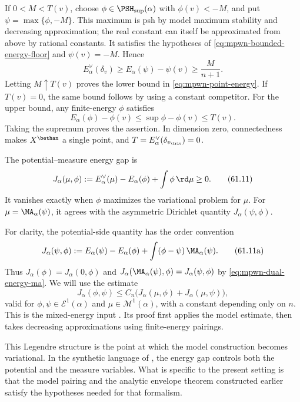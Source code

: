 \begin{example}
If $0<M<T(v)$, choose $\phi\in\PSH_{\sup}(\alpha)$ with
$\phi(v)<-M$, and put $\psi=\max\{\phi,-M\}$.
This maximum is psh by model maximum stability and decreasing
approximation; the real constant can itself be approximated
from above by rational constants.
It satisfies the hypotheses of \eqref{eq:mpwn-bounded-energy-floor}
and $\psi(v)=-M$.  Hence
\[
 E_\alpha^\vee(\delta_v)
       \geq E_\alpha(\psi)-\psi(v)
       \geq\frac{M}{n+1}.
\]
Letting $M\uparrow T(v)$ proves the lower bound in
\eqref{eq:mpwn-point-energy}.  If $T(v)=0$, the same bound follows
by using a constant competitor.
For the upper bound, any finite-energy $\phi$ satisfies
\[
 E_\alpha(\phi)-\phi(v)
                \leq\sup\phi-\phi(v)\leq T(v).
\]
Taking the supremum proves the assertion.  In dimension zero,
connectedness makes $X^{\bethan}$ a single point, and
$T=E_\alpha^\vee(\delta_{v_{\triv}})=0$.
\end{example}

The potential--measure energy gap is
\[
 J_\alpha(\mu,\phi)
 :=E_\alpha^\vee(\mu)-E_\alpha(\phi)+\int\phi\,\rd \mu
 \geq0.
\tag{61.11}\label{eq:mpwn-energy-gap}
\]
It vanishes exactly when $\phi$ maximizes the variational problem for
$\mu$.  For $\mu=\MA_\alpha(\psi)$, it agrees with the asymmetric
Dirichlet quantity $J_\alpha(\psi,\phi)$.

For clarity, the potential-side quantity has the order convention
\[
 J_\alpha(\psi,\phi)
   :=E_\alpha(\psi)-E_\alpha(\phi)
                     +\int(\phi-\psi)\,\MA_\alpha(\psi).
\tag{61.11a}\label{eq:mpwn-potential-energy-gap}
\]
Thus $J_\alpha(\phi)=J_\alpha(0,\phi)$ and
$J_\alpha(\MA_\alpha(\psi),\phi)=J_\alpha(\psi,\phi)$ by
\eqref{eq:mpwn-dual-energy-ma}.  We will use the estimate
\[
 J_\alpha(\phi,\psi)
       \leq C_n\bigl(J_\alpha(\mu,\phi)+J_\alpha(\mu,\psi)\bigr),
\tag{61.11b}\label{eq:mpwn-gap-control}
\]
valid for $\phi,\psi\in\mathcal E^1(\alpha)$ and
$\mu\in\mathcal M^1(\alpha)$, with a constant depending only on
$n$.  This is the mixed-energy input
\cite[Lemma~2.3.6(2)]{MPWN25}.  Its proof first applies the
model estimate, then takes decreasing approximations using
finite-energy pairings.


This Legendre structure is the point at which the model construction becomes
variational.  In the synthetic language of \cite{BJ25FiniteEnergy}, the
energy gap controls both the potential and the measure variables.  What is
specific to the present setting is that the model pairing and the analytic
envelope theorem constructed earlier satisfy the hypotheses needed for that
formalism.

